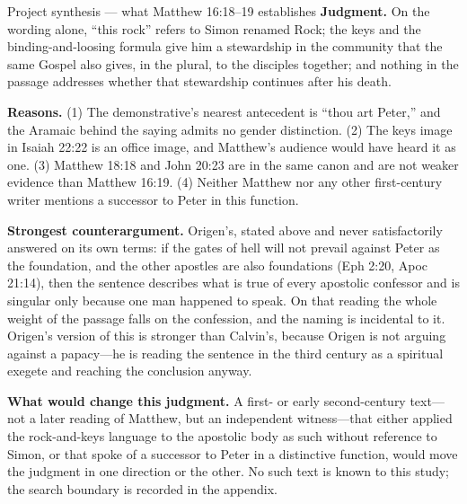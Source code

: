\begin{studybox}{Project synthesis --- what Matthew 16:18--19 establishes}
\textbf{Judgment.} On the wording alone, ``this rock'' refers to Simon
renamed Rock; the keys and the binding-and-loosing formula give him a
stewardship in the community that the same Gospel also gives, in the plural,
to the disciples together; and nothing in the passage addresses whether that
stewardship continues after his death.

\textbf{Reasons.} (1) The demonstrative's nearest antecedent is ``thou art
Peter,'' and the Aramaic behind the saying admits no gender distinction. (2)
The keys image in Isaiah 22:22 is an office image, and Matthew's audience
would have heard it as one. (3) Matthew 18:18 and John 20:23 are in the same
canon and are not weaker evidence than Matthew 16:19. (4) Neither Matthew nor
any other first-century writer mentions a successor to Peter in this
function.

\textbf{Strongest counterargument.} Origen's, stated above and never
satisfactorily answered on its own terms: if the gates of hell will not
prevail against Peter as the foundation, and the other apostles are also
foundations (Eph 2:20, Apoc 21:14), then the sentence describes what is true
of every apostolic confessor and is singular only because one man happened to
speak. On that reading the whole weight of the passage falls on the
confession, and the naming is incidental to it. Origen's version of this is
stronger than Calvin's, because Origen is not arguing against a papacy---he
is reading the sentence in the third century as a spiritual exegete and
reaching the conclusion anyway.

\textbf{What would change this judgment.} A first- or early second-century
text---not a later reading of Matthew, but an independent witness---that
either applied the rock-and-keys language to the apostolic body as such
without reference to Simon, or that spoke of a successor to Peter in a
distinctive function, would move the judgment in one direction or the other.
No such text is known to this study; the search boundary is recorded in the
appendix.
\end{studybox}
